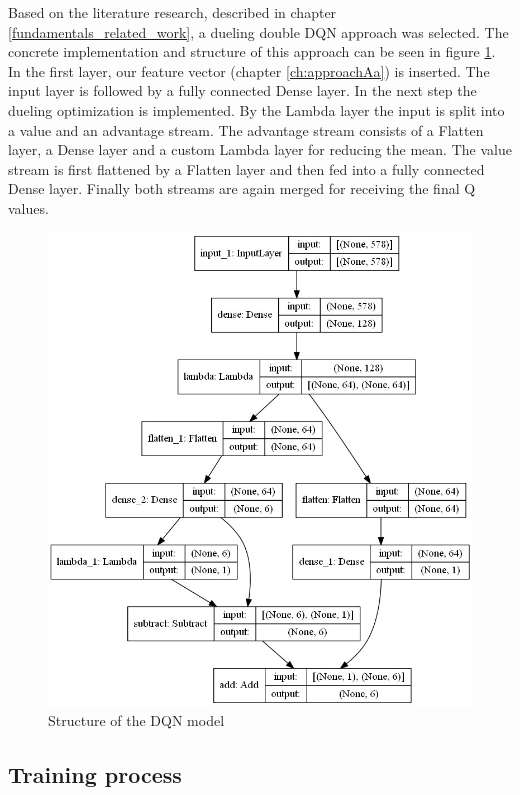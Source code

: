 Based on the literature research, described in chapter \ref{fundamentals_related_work}, a dueling double DQN approach was selected. The concrete implementation and structure of this approach can be seen in figure \ref{fig:model}.
In the first layer, our feature vector (chapter \ref{ch:approachAa}) is inserted. The input layer is followed by a fully connected Dense layer. In the next step the dueling optimization is implemented. By the Lambda layer the input is split into a value and an advantage stream. 
The advantage stream consists of a Flatten layer, a Dense layer and a custom Lambda layer for reducing the mean.
The value stream is first flattened by a Flatten layer and then fed into a fully connected Dense layer.
Finally both streams are again merged for receiving the final Q values.

\begin{figure}[ht]
	\centering
	\includegraphics[width=0.8\linewidth]{figures/model.jpeg}
	\caption{Structure of the DQN model}
	\label{fig:model}
\end{figure}

\subsection{Training process} 
\label{ch:approachB}


